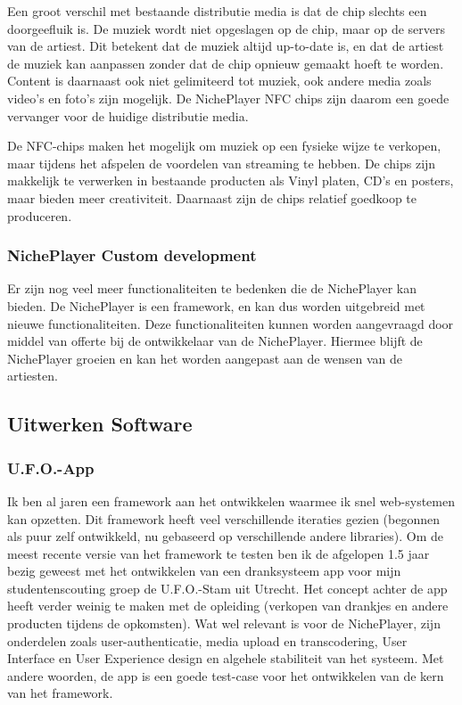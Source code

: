 Een groot verschil met bestaande distributie media is dat de chip slechts een doorgeefluik is. De muziek wordt niet opgeslagen op de chip, maar op de servers van de artiest. Dit betekent dat de muziek altijd up-to-date is, en dat de artiest de muziek kan aanpassen zonder dat de chip opnieuw gemaakt hoeft te worden. Content is daarnaast ook niet gelimiteerd tot muziek, ook andere media zoals video's en foto's zijn mogelijk. De NichePlayer NFC chips zijn daarom een goede vervanger voor de huidige distributie media.

De NFC-chips maken het mogelijk om muziek op een fysieke wijze te verkopen, maar tijdens het afspelen de voordelen van streaming te hebben. De chips zijn makkelijk te verwerken in bestaande producten als Vinyl platen, CD's en posters, maar bieden meer creativiteit. Daarnaast zijn de chips relatief goedkoop te produceren.

\subsubsection*{NichePlayer Custom development}
Er zijn nog veel meer functionaliteiten te bedenken die de NichePlayer kan bieden. De NichePlayer is een framework, en kan dus worden uitgebreid met nieuwe functionaliteiten. Deze functionaliteiten kunnen worden aangevraagd door middel van offerte bij de ontwikkelaar van de NichePlayer. Hiermee blijft de NichePlayer groeien en kan het worden aangepast aan de wensen van de artiesten.

\subsection {Uitwerken Software}
\subsubsection*{U.F.O.-App}
Ik ben al jaren een framework aan het ontwikkelen waarmee ik snel web-systemen kan opzetten. Dit framework heeft veel verschillende iteraties gezien (begonnen als puur zelf ontwikkeld, nu gebaseerd op verschillende andere libraries). Om de meest recente versie van het framework te testen ben ik de afgelopen 1.5 jaar bezig geweest met het ontwikkelen van een dranksysteem app voor mijn studentenscouting groep de U.F.O.-Stam uit Utrecht. Het concept achter de app heeft verder weinig te maken met de opleiding (verkopen van drankjes en andere producten tijdens de opkomsten). Wat wel relevant is voor de NichePlayer, zijn onderdelen zoals user-authenticatie, media upload en transcodering, User Interface en User Experience design en algehele stabiliteit van het systeem. Met andere woorden, de app is een goede test-case voor het ontwikkelen van de kern van het framework.

